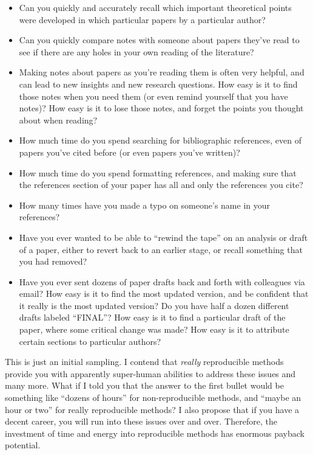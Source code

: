 \documentclass{book}
\begin{document}
\begin{itemize}
\item Can you quickly and accurately recall which important theoretical points were developed in which particular papers by a particular author?
\item Can you quickly compare notes with someone about papers they've read to see if there are any holes in your own reading of the literature?
\item Making notes about papers as you're reading them is often very helpful, and can lead to new insights and new research questions.  How easy is it to find those notes when you need them (or even remind yourself that you have notes)? How easy is it to lose those notes, and forget the points you thought about when reading?
\item How much time do you spend searching for bibliographic references, even of papers you've cited before (or even papers you've written)?
\item How much time do you spend formatting references, and making sure that the references section of your paper has all and only the references you cite?
\item How many times have you made a typo on someone's name in your references?
\item Have you ever wanted to be able to ``rewind the tape'' on an analysis or draft of a paper, either to revert back to an earlier stage, or recall something that you had removed?
\item Have you ever sent dozens of paper drafts back and forth with colleagues via email? How easy is it to find the most updated version, and be confident that it really is the most updated version? Do you have half a dozen different drafts labeled ``FINAL''? How easy is it to find a particular draft of the paper, where some critical change was made? How easy is it to attribute certain sections to particular authors?
\end{itemize}

This is just an initial sampling. I contend that \emph{really} reproducible methods provide you with apparently super-human abilities to address these issues and many more. What if I told you that the answer to the first bullet would be something like ``dozens of hours'' for non-reproducible methods, and ``maybe an hour or two'' for really reproducible methods?  I also propose that if you have a decent career, you will run into these issues over and over. Therefore, the investment of time and energy into reproducible methods has enormous payback potential.
\end{document}
